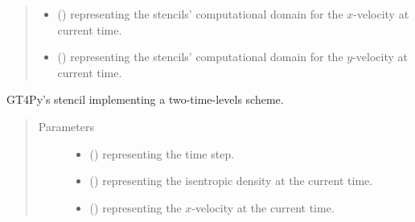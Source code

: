 \documentclass[letterpaper,10pt,english]{sphinxmanual}
\begin{document}
\begin{fulllineitems}
\begin{fulllineitems}
\begin{quote}
\begin{description}
\begin{itemize}
\item {} 
 () \textendash{}  representing the stencils’ computational domain for the \(x\)-velocity at current time.

\item {} 
 () \textendash{}  representing the stencils’ computational domain for the \(y\)-velocity at current time.

\end{itemize}

\end{description}\end{quote}

\end{fulllineitems}


\begin{fulllineitems}
\label{\detokenize{api:dycore.prognostic_isentropic.PrognosticIsentropicTL2._defs_stencil}}
GT4Py’s stencil implementing a two-time-levels scheme.
\begin{quote}\begin{description}
\item[{Parameters}] \leavevmode\begin{itemize}
\item {} 
 () \textendash{}  representing the time step.

\item {} 
 () \textendash{}  representing the isentropic density at the current time.

\item {} 
 () \textendash{}  representing the \(x\)-velocity at the current time.


\end{itemize}
\end{description}
\end{quote}
\end{fulllineitems}
\end{fulllineitems}
\end{document}

